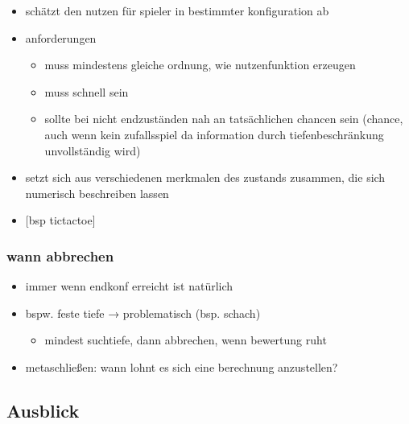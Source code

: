 \documentclass[]{article}
\begin{document}
\begin{itemize}
\item
  schätzt den nutzen für spieler in bestimmter konfiguration ab
\item
  anforderungen

  \begin{itemize}
  \item
    muss mindestens gleiche ordnung, wie nutzenfunktion erzeugen
  \item
    muss schnell sein
  \item
    sollte bei nicht endzuständen nah an tatsächlichen chancen sein
    (chance, auch wenn kein zufallsspiel da information durch
    tiefenbeschränkung unvollständig wird)
  \end{itemize}
\item
  setzt sich aus verschiedenen merkmalen des zustands zusammen, die sich
  numerisch beschreiben lassen
\item
  {[}bsp tictactoe{]}
\end{itemize}

\hypertarget{header-n1544}{%
\subsubsection{wann abbrechen}\label{header-n1544}}

\begin{itemize}
\item
  immer wenn endkonf erreicht ist natürlich
\item
  bspw. feste tiefe → problematisch (bsp. schach)

  \begin{itemize}
  \item
    mindest suchtiefe, dann abbrechen, wenn bewertung ruht
  \end{itemize}
\item
  metaschließen: wann lohnt es sich eine berechnung anzustellen?
\end{itemize}

\hypertarget{header-n792}{%
\subsection{Ausblick}\label{header-n792}}
\end{document}
